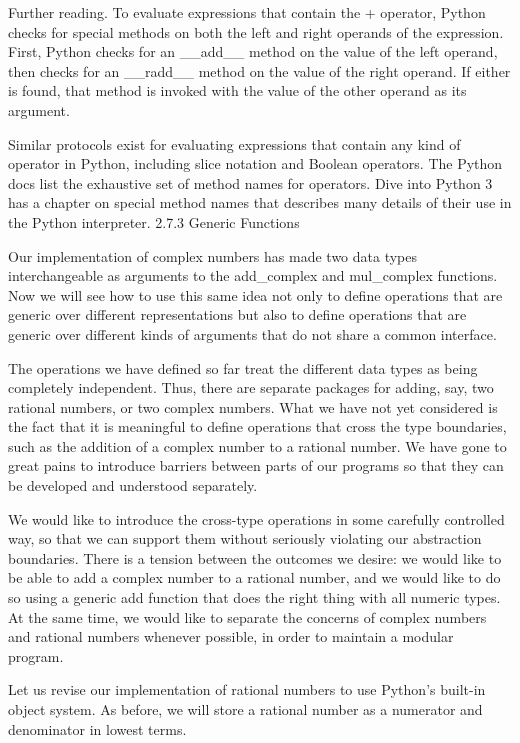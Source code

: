 \documentclass[letterpaper,10pt,dvipdfmx]{sphinxmanual}
\begin{document}
Further reading. To evaluate expressions that contain the + operator, Python checks for special methods on both the left and right operands of the expression. First, Python checks for an \_\_add\_\_ method on the value of the left operand, then checks for an \_\_radd\_\_ method on the value of the right operand. If either is found, that method is invoked with the value of the other operand as its argument.

Similar protocols exist for evaluating expressions that contain any kind of operator in Python, including slice notation and Boolean operators. The Python docs list the exhaustive set of method names for operators. Dive into Python 3 has a chapter on special method names that describes many details of their use in the Python interpreter.
2.7.3   Generic Functions

Our implementation of complex numbers has made two data types interchangeable as arguments to the add\_complex and mul\_complex functions. Now we will see how to use this same idea not only to define operations that are generic over different representations but also to define operations that are generic over different kinds of arguments that do not share a common interface.

The operations we have defined so far treat the different data types as being completely independent. Thus, there are separate packages for adding, say, two rational numbers, or two complex numbers. What we have not yet considered is the fact that it is meaningful to define operations that cross the type boundaries, such as the addition of a complex number to a rational number. We have gone to great pains to introduce barriers between parts of our programs so that they can be developed and understood separately.

We would like to introduce the cross-type operations in some carefully controlled way, so that we can support them without seriously violating our abstraction boundaries. There is a tension between the outcomes we desire: we would like to be able to add a complex number to a rational number, and we would like to do so using a generic add function that does the right thing with all numeric types. At the same time, we would like to separate the concerns of complex numbers and rational numbers whenever possible, in order to maintain a modular program.

Let us revise our implementation of rational numbers to use Python's built-in object system. As before, we will store a rational number as a numerator and denominator in lowest terms.
\end{document}
